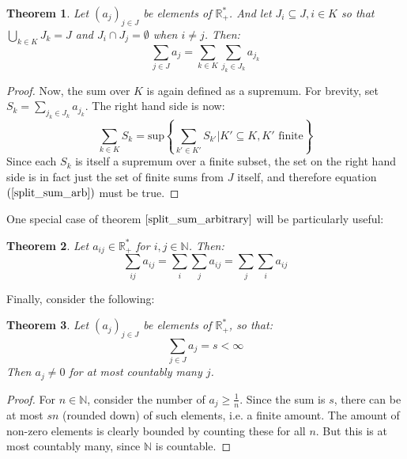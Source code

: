 \documentclass[12pt, a4paper]{article}
\newtheorem{theorem}{Theorem}[section]
\numberwithin{equation}{section}
\begin{document}
\begin{theorem}
\label{split_sum_arbitrary}
Let $(a_j)_{j\in J}$ be elements of $\mathbb{R}_+^*$. And let $J_i\subseteq J, i\in K$ so that $\bigcup_{k\in K} J_k=J$ and $J_i\cap J_j=\emptyset$ when $i\neq j$. Then:
\begin{equation}
\label{split_sum_arb}
\sum_{j\in J} a_j = \sum_{k\in K}\sum_{j_k\in J_k}a_{j_k}
\end{equation}
\end{theorem}
\begin{proof}
Now, the sum over $K$ is again defined as a supremum. For brevity, set $S_k=\sum_{j_k\in J_k}a_{j_k}$. The right hand side is now:
\begin{equation}
\sum_{k\in K}S_k=\textrm{sup}\left\{\sum_{k'\in K'} S_{k'}|K'\subseteq K, K'\textrm{ finite}\right\}
\end{equation}
Since each $S_k$ is itself a supremum over a finite subset, the set on the right hand side is in fact just the set of finite sums from $J$ itself, and therefore equation $(\ref{split_sum_arb})$ must be true.
\end{proof}

One special case of theorem $\ref{split_sum_arbitrary}$ will be particularly useful:

\begin{theorem}
\label{switch_sum}
Let $a_{ij}\in\mathbb{R}_+^*$ for $i,j\in\mathbb{N}$. Then:
\begin{equation}
\sum_{ij}a_{ij}=\sum_i\sum_j a_{ij}=\sum_j\sum_i a_{ij}
\end{equation}
\end{theorem}

Finally, consider the following:
\begin{theorem}
\label{infinite_sum_finite}
Let $(a_j)_{j\in J}$ be elements of $\mathbb{R}_+^*$, so that:
\begin{equation}
\sum_{j\in J}a_j=s<\infty
\end{equation}
Then $a_j\neq 0$ for at most countably many $j$.
\end{theorem}
\begin{proof}
For $n\in\mathbb{N}$, consider the number of $a_j\ge\frac{1}{n}$. Since the sum is $s$, there can be at most $sn$ (rounded down) of such elements, i.e. a finite amount. The amount of non-zero elements is clearly bounded by counting these for all $n$. But this is at most countably many, since $\mathbb{N}$ is countable.
\end{proof}
\end{document}
